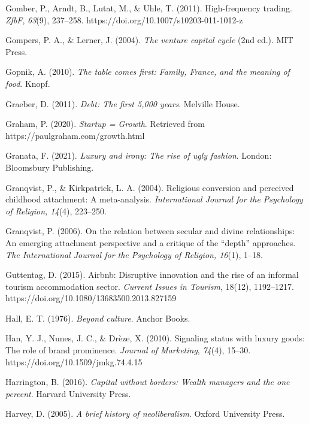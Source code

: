 \begin{thebibliography}{}
    Gomber, P., Arndt, B., Lutat, M., \& Uhle, T. (2011). High-frequency trading. \textit{ZfbF}, \textit{63}(9), 237–258. https://doi.org/10.1007/s10203-011-1012-z

    Gompers, P. A., \& Lerner, J. (2004). \textit{The venture capital cycle} (2nd ed.). MIT Press.

    Gopnik, A. (2010). \textit{The table comes first: Family, France, and the meaning of food}. Knopf.

    Graeber, D. (2011). \textit{Debt: The first 5{,}000 years}. Melville House.

    Graham, P. (2020). \textit{Startup = Growth}. Retrieved from https://paulgraham.com/growth.html

    Granata, F. (2021). \textit{Luxury and irony: The rise of ugly fashion}. London: Bloomsbury Publishing.

    Granqvist, P., \& Kirkpatrick, L. A. (2004). Religious conversion and perceived childhood attachment: A meta-analysis. \textit{International Journal for the Psychology of Religion, 14}(4), 223–250.

    Granqvist, P. (2006). On the relation between secular and divine relationships: An emerging attachment perspective and a critique of the “depth” approaches. \textit{The International Journal for the Psychology of Religion, 16}(1), 1–18.

    Guttentag, D. (2015). Airbnb: Disruptive innovation and the rise of an informal tourism accommodation sector. \textit{Current Issues in Tourism}, 18(12), 1192–1217. https://doi.org/10.1080/13683500.2013.827159


    Hall, E. T. (1976). \textit{Beyond culture}. Anchor Books.

    Han, Y. J., Nunes, J. C., \& Drèze, X. (2010). Signaling status with luxury goods: The role of brand prominence. \textit{Journal of Marketing}, \textit{74}(4), 15--30. https://doi.org/10.1509/jmkg.74.4.15

    Harrington, B. (2016). \textit{Capital without borders: Wealth managers and the one percent}. Harvard University Press.

    Harvey, D. (2005). \textit{A brief history of neoliberalism}. Oxford University Press.


\end{thebibliography}
